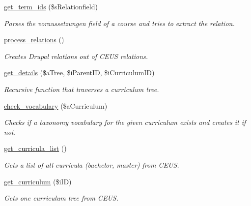 \begin{DoxyCompactItemize}
\hyperlink{classceus__importer_acc5550c279b1a38aac4ee7fe0680e14d}{get\+\_\+term\+\_\+ids} (\$s\+Relationfield)
\begin{DoxyCompactList}\small\item\em Parses the {\ttfamily voraussetzungen} field of a course and tries to extract the relation. \end{DoxyCompactList}\item 
\hyperlink{classceus__importer_a04b7723caf55a2cfd4b92d02754748dc}{process\+\_\+relations} ()
\begin{DoxyCompactList}\small\item\em Creates Drupal relations out of C\+E\+U\+S relations. \end{DoxyCompactList}\item 
\hyperlink{classceus__importer_a404368bea7498901cfdc0fca559089b6}{get\+\_\+details} (\$a\+Tree, \$i\+Parent\+I\+D, \$i\+Curriculum\+I\+D)
\begin{DoxyCompactList}\small\item\em Recursive function that traverses a curriculum tree. \end{DoxyCompactList}\item 
\hyperlink{classceus__importer_a5cd89fd2b1560b25eb4300ea6662a1b7}{check\+\_\+vocabulary} (\$a\+Curriculum)
\begin{DoxyCompactList}\small\item\em Checks if a taxonomy vocabulary for the given curriculum exists and creates it if not. \end{DoxyCompactList}\item 
\hyperlink{classceus__importer_a16485f39c6678a011ff758e76bf1f458}{get\+\_\+curricula\+\_\+list} ()
\begin{DoxyCompactList}\small\item\em Gets a list of all curricula (bachelor, master) from C\+E\+U\+S. \end{DoxyCompactList}\item 
\hyperlink{classceus__importer_a0282b9b18ad499198f75d6d81fc82ad0}{get\+\_\+curriculum} (\$i\+I\+D)
\begin{DoxyCompactList}\small\item\em Gets one curriculum tree from C\+E\+U\+S. \end{DoxyCompactList}\end{DoxyCompactItemize}
